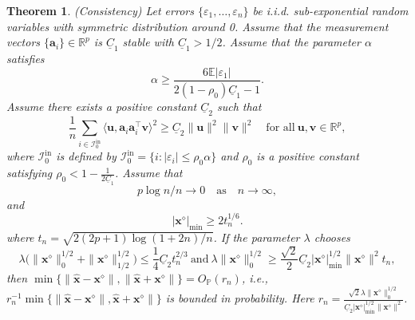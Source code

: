 \documentclass{article}
\newtheorem{theorem}{Theorem}[section]
\numberwithin{equation}{section}
\begin{document}
\begin{theorem}\label{consistency}(Consistency) Let errors $\{\varepsilon_1,\ldots,\varepsilon_n\}$ be i.i.d. sub-exponential random variables with symmetric distribution around 0. Assume that the measurement vectors $\{\mathbf{a}_i\}\in\mathbb{R}^p$ is $\underline{C}_1$ stable with $\underline{C}_1>1/2$.  Assume that the parameter $\alpha$ satisfies \begin{equation}\label{cond-alpha-consistency}
		\alpha\geq\frac{6\mathbb{E}|\varepsilon_1|}{2(1-\rho_0)\underline{C}_1-1}.
	\end{equation}
	Assume there exists a positive constant $\underline{C}_2$ such that
	\begin{equation}\label{cond-ai-c2}
		\frac{1}{n}\sum_{i\in\mathcal{I}_{0}^{\mathrm{in}}}\langle \mathbf{u}, \mathbf{a}_i\mathbf{a}_i^\top\mathbf{v}\rangle^2\geq\underline{C}_2\|\mathbf{u}\| ^2\|\mathbf{v}\| ^2
		\quad \text{for all} ~\mathbf{u}, \mathbf{v}\in\mathbb{R}^p,
	\end{equation}
	where $\mathcal{I}_{0}^{\mathrm{in}}$ is defined by $\mathcal{I}_{0}^{\mathrm{in}}=\{i: |\varepsilon_i|\leq\rho_0\alpha\}$ and 
	$\rho_0$ is a positive constant satisfying $\rho_0<1-\frac{1}{2\underline{C}_1}$.
 Assume that \begin{equation}\label{cond-np-consistency} p\log n/n\to0 \quad\mbox{as}\quad n\to\infty,\end{equation}
 and \begin{equation}\label{cond-true-min}
 	|\mathbf{x}^\diamond|_{\mathrm{min}}\geq 2t_n^{1/6}.
 \end{equation} 
where $t_n=\sqrt{2(2p+1)\log(1+2n)/n}$. 
If the parameter $\lambda$ chooses \begin{equation}\label{cond-lambda-consistency}\lambda\big(\|\mathbf{x}^\diamond\|_{0}^{1/2}+\|\mathbf{x}^\diamond\|_{1/2}^{1/2}\big)
	\leq\frac{1}{4}\underline{C}_2t_n^{2/3}~\mbox{and}
	~\lambda\|\mathbf{x}^\diamond\|_0^{1/2}\geq \frac{\sqrt{2}}{2}\underline{C}_2|\mathbf{x}^\diamond|_{\mathrm{min}}^{1/2}\|\mathbf{x}^\diamond\|^2t_n,\end{equation} 
  then 
	$\min\{\|\hat{\mathbf{x}}-\mathbf{x}^\diamond\|, \|\hat{\mathbf{x}}+\mathbf{x}^\diamond\|\}=O_{\mathbb{P}}(r_n)$, i.e., $r_n^{-1}\min\{\|\hat{\mathbf{x}}-\mathbf{x}^\diamond\|, \hat{\mathbf{x}}+\mathbf{x}^\diamond\|\}$ is bounded in probability. Here $r_{n}=\frac{\sqrt{2}\lambda\|\mathbf{x}^\diamond\|_0^{1/2}}{\underline{C}_2|\mathbf{x}^\diamond|_{\mathrm{min}}^{1/2}\|\mathbf{x}^\diamond\|^2}$.
\end{theorem}
\end{document}
